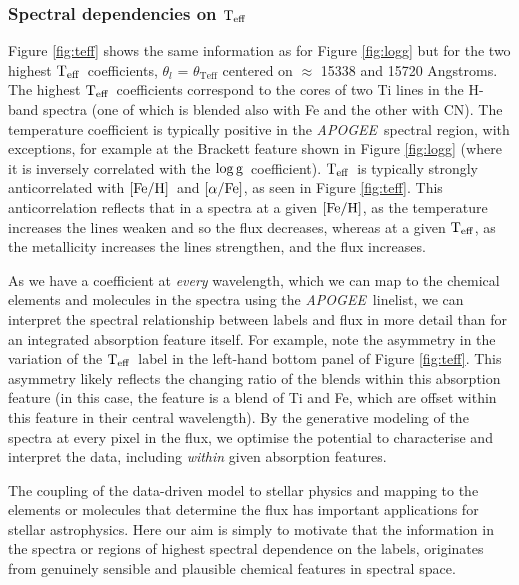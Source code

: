 \documentclass[12pt, preprint]{aastex}
\newcommand{\project}[1]{\textsl{#1}}
\newcommand{\apogee}{\project{APOGEE}}
\newcommand{\teff}{\mbox{$\rm T_{eff}$}}
\newcommand{\feh}{\mbox{$\rm [Fe/H]$}}
\newcommand{\alphafe}{\mbox{$\rm [\alpha/Fe]$}}
\newcommand{\logg}{\mbox{$\rm \log g$}}
\begin{document}
\subsubsection{Spectral dependencies on \teff} 

Figure \ref{fig:teff} shows the same information as for Figure \ref{fig:logg} but for the two highest \teff\ coefficients, $\theta_l$ = $\theta_{\mbox{Teff}}$ centered on $\approx$ 15338 and 15720 Angstroms. The highest \teff\ coefficients correspond to the cores of two Ti lines in the H-band spectra (one of which is blended also with Fe and the other with CN). The temperature coefficient is typically positive in the \apogee\ spectral region, with exceptions, for example at the Brackett feature shown in Figure \ref{fig:logg} (where it is inversely correlated with the \logg\ coefficient). \teff\ is typically strongly anticorrelated with \feh\ and \alphafe, as seen in Figure \ref{fig:teff}. This anticorrelation reflects that in a spectra at a given \feh, as the temperature increases the lines weaken and so the flux decreases, whereas at a given \teff, as the metallicity increases the lines strengthen, and the flux increases. 

As we have a coefficient at \textit{every} wavelength, which we can map to the chemical elements and molecules in the spectra using the \apogee\ linelist, we can interpret the spectral relationship between labels and flux in more detail than for an integrated absorption feature itself.  For example, note the asymmetry in the variation of the \teff\ label in the left-hand bottom panel of Figure \ref{fig:teff}. This asymmetry likely reflects the changing ratio of the blends within this absorption feature (in this case, the feature is a blend of Ti and Fe, which are offset within this feature in their central wavelength). By the generative modeling of the spectra at every pixel in the flux, we optimise the potential to characterise and interpret the data, including \textit{within} given absorption features. 

The coupling of the data-driven model to stellar physics and mapping to the elements or molecules that determine the flux has important applications for stellar astrophysics. Here our aim is simply to motivate that the information in the spectra or regions of highest spectral dependence on the labels, originates from genuinely sensible and plausible chemical features in spectral space.  
\end{document}
